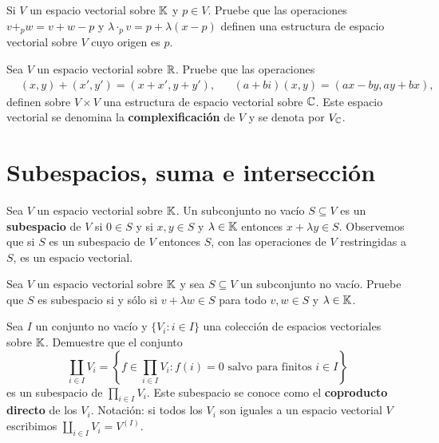 \begin{xca}
	Si $V$ un espacio vectorial sobre $\mathbb{K}$ y $p\in V$. Pruebe que las operaciones
	$v+_pw=v+w-p$ y $\lambda\cdot_p v=p+\lambda (x-p)$ definen una estructura
	de espacio vectorial sobre $V$ cuyo origen es $p$.
\end{xca}

\begin{xca}
	Sea $V$ un espacio vectorial sobre $\mathbb{R}$. Pruebe que las operaciones
    \begin{align*}
      &(x,y)+(x',y')=(x+x',y+y'),
      &&(a+bi)(x,y)=(ax-by,ay+bx),
    \end{align*}
    definen sobre $V\times V$ una estructura de espacio vectorial sobre $\mathbb{C}$.
    Este espacio vectorial se denomina la \textbf{complexificación} de $V$ y se
    denota por $V_{\mathbb{C}}$.
\end{xca}

\section{Subespacios, suma e intersección}

\begin{block}
    Sea $V$ un espacio vectorial sobre $\mathbb{K}$.  Un subconjunto no vacío
    $S\subseteq V$ es un \textbf{subespacio} de $V$ si $0\in S$ y si $x,y\in S$
    y $\lambda\in\mathbb{K}$ entonces $x+\lambda y\in S$. Observemos que si $S$ es un
    subespacio de $V$ entonces $S$, con las operaciones de $V$ restringidas a
    $S$, es un espacio vectorial.
\end{block}

\begin{xca}
    \label{xca:subespacio}
	Sea $V$ un espacio vectorial sobre $\mathbb{K}$ y sea $S\subseteq V$ un subconjunto
	no vacío. Pruebe que $S$ es subespacio si y sólo si $v+\lambda w\in S$ para
	todo $v,w\in S$ y $\lambda\in\mathbb{K}$.
\end{xca}

\begin{xca}
    Sea $I$ un conjunto no vacío y $\{V_i:i\in I\}$ una colección de espacios
    vectoriales sobre $\mathbb{K}$. Demuestre que el conjunto
    \[
        \coprod_{i\in I}V_i=\left\{f\in\prod_{i\in I}V_i:f(i)=0\text{ salvo para finitos $i\in I$}\right\}
    \]
    es un subespacio de $\prod_{i\in I}V_i$. Este subespacio se conoce como el
    \textbf{coproducto directo} de los $V_i$. Notación: si todos los $V_i$ son
    iguales a un espacio vectorial $V$ escribimos $\coprod_{i\in
    I}V_i=V^{(I)}$. 
\end{xca}

